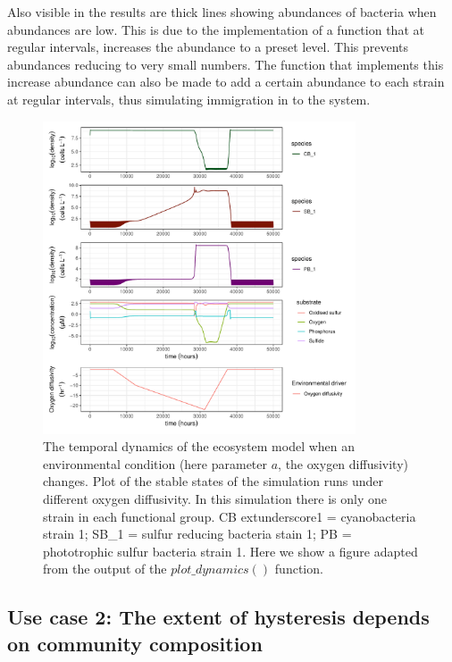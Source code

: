 \documentclass[]{elsarticle} %
\begin{document}
Also visible in the results are thick lines showing abundances of
bacteria when abundances are low. This is due to the implementation of a
function that at regular intervals, increases the abundance to a preset
level. This prevents abundances reducing to very small numbers. The
function that implements this increase abundance can also be made to add
a certain abundance to each strain at regular intervals, thus simulating
immigration in to the system.

\begin{figure}

{\centering \includegraphics[width=350px]{figures/gen_uc1_partrep_temporal_state_switching} 

}

\caption{The temporal dynamics of the ecosystem model when an environmental condition (here parameter $a$, the oxygen diffusivity) changes. Plot of the stable states of the simulation runs under different oxygen diffusivity. In this simulation there is only one strain in each functional group. CB   extunderscore1 = cyanobacteria strain 1; SB\_1 = sulfur reducing bacteria stain 1; PB = phototrophic sulfur bacteria strain 1. Here we show a figure adapted from the output of the $plot\_dynamics()$  function.}\label{fig:uc1}
\end{figure}

\hypertarget{use-case-2-the-extent-of-hysteresis-depends-on-community-composition}{%
\subsection{Use case 2: The extent of hysteresis depends on community
composition}\label{use-case-2-the-extent-of-hysteresis-depends-on-community-composition}}
\end{document}
